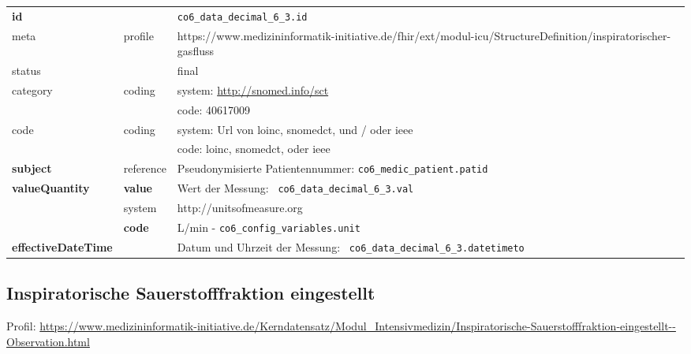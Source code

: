 \begin{longtable}{|l|l|p{7.5cm}|}
        \hline
        \rowcolor{lightgray} \multicolumn{3}{|l|}{Data Mapping (inhaltlich)} \\ \hline
        \textbf{id} &  & \texttt{co6\_data\_decimal\_6\_3.id} \\ \hline
	meta & profile & https://www.medizininformatik-initiative.de/fhir/ext/modul-icu/StructureDefinition/inspiratorischer-gasfluss \\ \hline 
	status &  & final   \\ \hline 
	category & coding & system: \url{http://snomed.info/sct} \\
\cline{3-3}
	& & code: 40617009 \\ \hline
	code & coding & system: Url von \ac{loinc}, \ac{snomedct}, und / oder \ac{ieee} \\ 
	\cline{3-3} 
	 &  & code: \ac{loinc}, \ac{snomedct}, oder \ac{ieee} \\ \hline
	 \textbf{subject}  & reference & Pseudonymisierte Patientennummer: \texttt{co6\_medic\_patient.patid} \\ \hline
	 \textbf{valueQuantity}  & \textbf{value} & Wert der Messung: \texttt{
co6\_data\_decimal\_6\_3.val} \\
        \cline{2-3}
         & system & http://unitsofmeasure.org \\
         \cline{2-3}
         & \textbf{code} & L/min - \texttt{co6\_config\_variables.unit}
\\ \hline
     \textbf{effectiveDateTime}  & & Datum und Uhrzeit der Messung: \texttt{
co6\_data\_decimal\_6\_3.datetimeto} \\
     \hline
\end{longtable}

\subsection{Inspiratorische Sauerstofffraktion eingestellt} 

Profil: \url{https://www.medizininformatik-initiative.de/Kerndatensatz/Modul_Intensivmedizin/Inspiratorische-Sauerstofffraktion-eingestellt--Observation.html}

